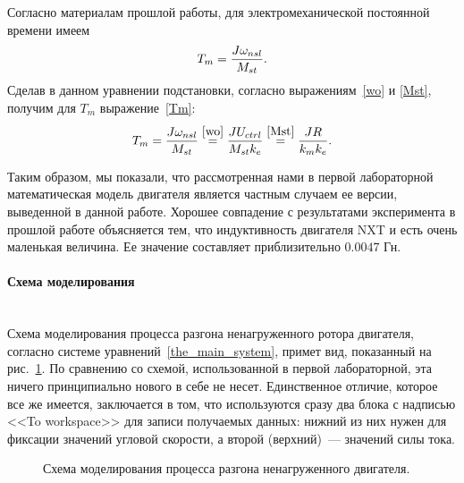 \documentclass[12pt, a4paper, openany]{extarticle}
\begin{document}
Согласно материалам прошлой работы, для электромеханической постоянной времени имеем
\begin{equation}
	T_m = \frac{J\omega_{nsl}}{M_{st}}\ldotp
\end{equation}
Сделав в данном уравнении подстановки, согласно выражениям~\eqref{wo} и \eqref{Mst}, получим для $T_m$ выражение~\eqref{Tm}:
\begin{equation}
	T_m = \frac{J\omega_{nsl}}{M_{st}} \stackrel{\eqref{wo}}{=} \frac{JU_{ctrl}}{M_{st}k_e} \stackrel{\eqref{Mst}}{=}
	\frac{JR}{k_mk_e}\ldotp
\end{equation}

Таким образом, мы показали, что рассмотренная нами в первой лабораторной математическая модель двигателя является частным случаем ее версии, выведенной в данной работе.
Хорошее совпадение с результатами эксперимента в прошлой работе объясняется тем, что индуктивность двигателя NXT и есть очень маленькая величина.
Ее значение составляет приблизительно $\text{0.0047 Гн}$.

\paragraph*{Схема моделирования}$\phantom{-}$\\
\hspace*{\parindent}Схема моделирования процесса разгона ненагруженного ротора двигателя, согласно системе уравнений~\eqref{the_main_system}, примет вид, показанный на рис.~\ref{struct_sheme}.
По сравнению со схемой, использованной в первой лабораторной, эта ничего принципиально нового в себе не несет. 
Единственное отличие, которое все же имеется, заключается в том, что используются сразу два блока с надписью <<To workspace>> для записи получаемых данных: нижний из них нужен для фиксации значений угловой скорости, а второй (верхний)~--- значений силы тока. 

\begin{figure}[h]
	\noindent{}
	\caption{Схема моделирования процесса разгона ненагруженного двигателя.}
	\label{struct_sheme}
\end{figure}
\end{document}
